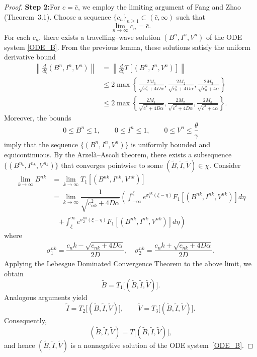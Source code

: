 \documentclass[11pt]{article}
\theoremstyle{definition}
\begin{document}
{\begin{proof}
    \noindent \textbf{Step 2:}For $c=\bar{c}$, we employ the limiting argument of Fang and Zhao \cite{FangJian2009MWfP} (Theorem~3.1). 
Choose a sequence $\{c_n\}_{n\ge1}\subset(\bar{c},\infty)$ such that
\[
\lim_{n\to\infty} c_n=\bar{c}.
\]
For each $c_n$, there exists a travelling–wave solution $(B^n,I^n,V^n)$ of the ODE system \eqref{ODE_B}. 
From the previous lemma, these solutions satisfy the uniform derivative bound
\begin{align*}
\left\|\frac{d}{d\xi}(B^n,I^n,V^n)\right\|
&= \left\|\frac{d}{d\xi}T[(B^n,I^n,V^n)]\right\| \\
&\le 2 \max \left\{
\frac{2M_1}{\sqrt{c_n^2+4D\alpha}},
\frac{2M_2}{\sqrt{c_n^2+4D\alpha}},
\frac{2M_3}{\sqrt{c_n^2+4\alpha}}
\right\} \\
&\le 2 \max \left\{
\frac{2M_1}{\sqrt{\bar c^2+4D\alpha}},
\frac{2M_2}{\sqrt{\bar c^2+4D\alpha}},
\frac{2M_3}{\sqrt{\bar c^2+4\alpha}}
\right\}.
\end{align*}
Moreover, the bounds
\[
0\le B^n\le1,\qquad
0\le I^n\le1,\qquad
0\le V^n\le\frac{\theta}{\gamma}
\]
imply that the sequence $\{(B^n,I^n,V^n)\}$ is uniformly bounded and equicontinuous.
By the Arzelà--Ascoli theorem, there exists a subsequence
$\{(B^{n_k},I^{n_k},V^{n_k})\}$ that converges pointwise to some
$(\tilde B,\tilde I,\tilde V)\in\chi$.
 Consider 
\begin{align}\label{B_k_convergence}
    \lim_{k \to \infty} B^{nk}& = \lim_{k \to \infty} T_1[(B^{nk},I^{nk},V^{nk})] \\ &= \lim_{k \to \infty}\dfrac{1}{\sqrt{c_{nk}^2+ 4 D \alpha}}\left( \int_{- \infty}^{\xi}e^{\sigma_1^{nk}(\xi-\eta)}F_1[(B^{nk},I^{nk},V^{nk})] d \eta \right. \\ & \quad \left.
 + \int_{\xi}^{\infty }e^{\sigma_2^{nk}(\xi-\eta)}F_1[(B^{nk},I^{nk},V^{nk})] d \eta \right) 
\end{align}
where \begin{align}
    \sigma_1^{nk}=\dfrac{c_nk- \sqrt{c_{nk}+ 4D\alpha}}{2 D}, \quad \sigma_2^{nk}=\dfrac{c_nk+ \sqrt{c_{nk}+ 4D\alpha}}{2 D}.
\end{align}
Applying the Lebesgue Dominated Convergence Theorem to the above limit, we obtain
\[
\tilde B = T_{1}\bigl[(\tilde B,\tilde I,\tilde V)\bigr].
\]
Analogous arguments yield
\[
\tilde I = T_{2}\bigl[(\tilde B,\tilde I,\tilde V)\bigr],
\qquad
\tilde V = T_{3}\bigl[(\tilde B,\tilde I,\tilde V)\bigr].
\]
Consequently,
\[
(\tilde B,\tilde I,\tilde V)
= T\bigl[(\tilde B,\tilde I,\tilde V)\bigr],
\]
and hence $(\tilde B,\tilde I,\tilde V)$ is a nonnegative solution of the ODE
system~\eqref{ODE_B}.



\end{proof}}
\end{document}
